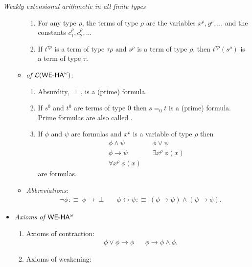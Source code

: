 \begin{dfn}{\em Weakly extensional arithmetic in all finite types }
\begin{itemize}
\begin{itemize}
       \setcounter{equation}{0}
       \begin{enumerate}
     \item For any type $\rho$, the terms of type $\rho$ are the variables $x^{\rho},y^\rho,...$ and 
       the constants $c_1^\rho,c_2^\rho,...$ %
     \item If $t^{\tau\rho}$ is a term of type $\tau\rho$ and $s^\rho$
       is a term of type $\rho$, then $t^{\tau\rho}(s^\rho)$ is a 
       term of type $\tau$.
     \end{enumerate}
   \item {\em {} of ${\mathcal{L}}({\textsf{\upshape WE-HA}}^{\omega})$}:
     \begin{enumerate}
     \item Absurdity, $\perp$, is a (prime) formula.
     \item If $s^0$ and $t^0$ are terms of type $0$ 
       then $s=_0t$ is a (prime) formula. Prime formulas are also called 
       .
     \item If $\phi$ and $\psi$ are formulas and $x^\rho$ is
       a variable of type $\rho$ then
         \begin{align*}
           &\phi \wedge \psi& &\phi\vee\psi\\
           &\phi \rightarrow \psi& &\exists x^\rho\ \phi(x)\\
           &\forall x^\rho\ \phi(x)
         \end{align*}
         are formulas.
       \end{enumerate}
     \item {\em Abbreviations}:
       \begin{align*}
         &\neg\phi:\equiv\ \phi\rightarrow\perp& 
         &\phi\leftrightarrow\psi:\equiv\ (\phi\rightarrow\psi)\wedge(\psi\rightarrow\phi)
         \text{.}\end{align*}
     \end{itemize} 
   \item {\em Axioms of ${\textsf{\upshape WE-HA}}^{\omega}$}
     \begin{enumerate}
       \item Axioms of contraction:
         \begin{align*}
           &\phi\vee\phi\rightarrow\phi& 
           &\phi\rightarrow\phi\wedge\phi
           \text{.}
         \end{align*}
       \item Axioms of weakening:
         \begin{align*}

\end{align*}
\end{enumerate}
\end{itemize}
\end{dfn}

